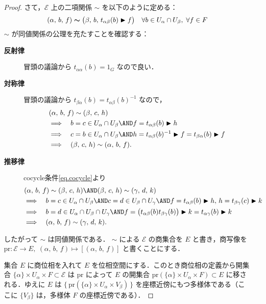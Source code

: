 \documentclass[geometry_main]{subfiles}
\begin{document}
\begin{proof}
	さて，$\mathcal{E}$ 上の二項関係 $\sim$ を以下のように定める：
	\begin{align}
		\label{eq.prop9-1_equiv}
		(\alpha,\, b,\, f) \bm{\sim} \bigl(\beta,\, b,\, t_{\alpha\beta}(b) \blacktriangleright f\bigr) \quad \forall b \in U_\alpha \cap U_\beta,\; \forall f \in F
	\end{align}
	$\sim$ が同値関係の公理を充たすことを確認する：
	\begin{description}
		\item[\textbf{反射律}] 冒頭の議論から $t_{\alpha\alpha}(b) = 1_G$ なので良い．
		\item[\textbf{対称律}] 冒頭の議論から $t_{\beta\alpha}(b) = t_{\alpha\beta}(b)^{-1}$  なので，
		\begin{align}
			&(\alpha,\, b,\, f) \sim (\beta,\, c,\, h) \\
            &\Longrightarrow \quad b=c \in U_\alpha \cap U_\beta \AND f = t_{\alpha\beta}(b) \btr h \\
			&\Longrightarrow \quad c=b \in U_\alpha \cap U_\beta \AND h = t_{\alpha\beta}(b)^{-1} \btr f = t_{\beta\alpha}(b) \btr f \\
			&\Longrightarrow \quad (\beta,\, c,\, h) \sim (\alpha,\, b,\, f).
		\end{align}
		\item[\textbf{推移律}] cocycle条件\eqref{eq.cocycle}より
		\begin{align}
			&(\alpha,\, b,\, f) \sim (\beta,\, c,\, h) \AND (\beta,\, c,\, h) \sim (\gamma,\, d,\, k) \\
			&\Longrightarrow \quad b=c \in U_\alpha \cap U_\beta \AND c=d \in U_\beta \cap U_\gamma\AND f = t_{\alpha\beta}(b) \btr h,\, h = t_{\beta\gamma}(c) \btr k \\
			&\Longrightarrow \quad b=d \in U_\alpha \cap U_\beta \cap U_\gamma \AND f = \bigl(t_{\alpha\beta}(b) t_{\beta\gamma}(b)\bigr) \btr k = t_{\alpha\gamma}(b)\btr k  \\
			&\Longrightarrow \quad (\alpha,\, b,\, f) \sim (\gamma,\, d,\, k).
		\end{align}
	\end{description}
	したがって $\sim$ は同値関係である．
	$\sim$ による $\mathcal{E}$ の商集合を $E$ と書き，商写像を $\mathrm{pr} \colon \mathcal{E} \to E,\; (\alpha,\, b,\, f)  \mapsto [ (\alpha,\, b,\, f)]$ と書くことにする．

	集合 $E$ に商位相を入れて $E$ を位相空間にする．このとき商位相の定義から開集合 $\{\alpha\} \times U_\alpha \times F \subset \mathcal{E}$ は $\mathrm{pr}$ によって $E$ の開集合 $\mathrm{pr}(\{\alpha\} \times U_\alpha \times F) \subset{E}$ に移される．ゆえに $E$ は $\bigl\{\, \mathrm{pr}(\{\alpha\} \times U_\alpha \times V_\beta)\, \bigr\}$ を座標近傍にもつ\cinfty 多様体である（ここに $\{ V_\beta \}$ は，\cinfty 多様体 $F$ の座標近傍である）．
	

\end{proof}
\end{document}

